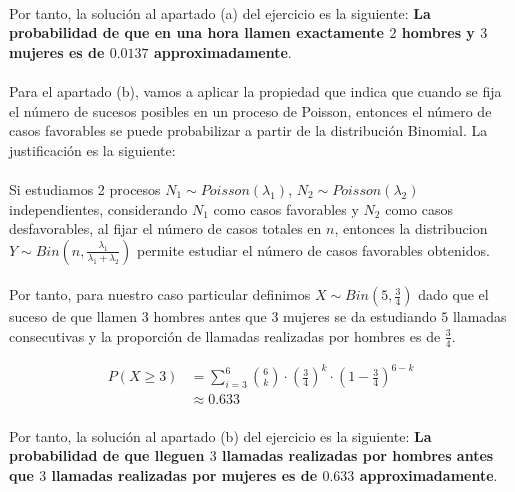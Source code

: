\documentclass[a4paper, spanish]{article}
\begin{document}
    \paragraph{}
    Por tanto, la solución al apartado (a) del ejercicio es la siguiente: \textbf{La probabilidad de que en una hora llamen exactamente $2$ hombres y $3$ mujeres es de $0.0137$ approximadamente}.

    \paragraph{}
    Para el apartado (b), vamos a aplicar la propiedad que indica que cuando se fija el número de sucesos posibles en un proceso de Poisson, entonces el número de casos favorables se puede probabilizar a partir de la distribución Binomial. La justificación es la siguiente:

    \paragraph{}
    Si  estudiamos 2 procesos $N_1 \sim Poisson(\lambda_1)$, $N_2 \sim Poisson(\lambda_2)$ independientes, considerando $N_1$ como casos favorables y $N_2$ como casos desfavorables, al fijar el número de casos totales en $n$, entonces la distribucion $Y \sim Bin\left(n, \frac{\lambda_1}{\lambda_1 + \lambda_2}\right)$ permite estudiar el número de casos favorables obtenidos.

    \paragraph{}
    Por tanto, para nuestro caso particular definimos $X \sim Bin\left(5, \frac{3}{4}\right)$ dado que el suceso de que llamen $3$ hombres antes que $3$ mujeres se da estudiando $5$ llamadas consecutivas y la proporción de llamadas realizadas por hombres es de $\frac{3}{4}$.

    \begin{align*}
      P(X \geq 3)
      &= \sum_{i = 3}^6 \binom{6}{k} \cdot \left(\frac{3}{4} \right)^k \cdot \left(1 - \frac{3}{4}\right) ^ {6 - k} \\
      &\approx 0.633
    \end{align*}

    \paragraph{}
    Por tanto, la solución al apartado (b) del ejercicio es la siguiente: \textbf{La probabilidad de que lleguen $3$ llamadas realizadas por hombres antes que $3$ llamadas realizadas por mujeres es de $0.633$ approximadamente}.
\end{document}
